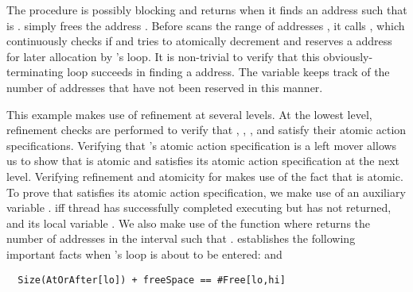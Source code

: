 The  procedure is possibly blocking and returns when it
finds an address  such that  is
.  simply frees the address
. 
Before  scans the range of addresses
\exC{[lo,hi]}, it calls , which continuously checks if
 and tries to atomically decrement 
and reserves a  address for later allocation by
's  loop. It is non-trivial to verify that this
obviously-terminating  loop succeeds in finding a
 address. The variable  keeps track of the
number of  addresses that have not been reserved in this
manner. 

This example makes use of refinement at several levels. At the lowest
level, refinement checks are performed to verify that 
, ,
, and
 satisfy their atomic action
specifications. Verifying that 's atomic
action specification is a left mover allows us to show that  is
atomic and satisfies its atomic action specification at the next level. 
Verifying refinement and atomicity for  makes use
of the fact that  is atomic. To prove that 
satisfies its atomic action specification, we make use of an auxiliary
variable .  iff thread
 has successfully completed executing  but has
not returned, and its local variable . We also make use
of the function  where  returns the number
of addresses  in the interval \exC{[u,v]} such that
. 
establishes the following important facts when 's
 loop is about to be entered:  and 
\begin{verbatim}
  Size(AtOrAfter[lo]) + freeSpace == #Free[lo,hi] 
\end{verbatim}


%
%
%
%
%


